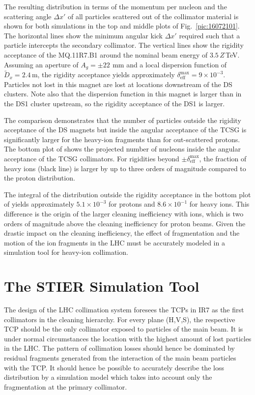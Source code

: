 The resulting distribution in terms of the momentum per nucleon and the scattering angle $\Delta x'$ of all  particles scattered out of the collimator material is shown for both simulations in the top and middle plots of Fig.~\ref{pic:16072101}. The horizontal lines show the minimum angular kick $\Delta x'$ required such that a particle intercepts the secondary collimator. The vertical lines show the rigidity acceptance of the MQ.11R7.B1 around the nominal beam energy of $3.5\,Z\,$TeV. Assuming an aperture of $A_g = \pm 22~\,$mm and a local dispersion function of $\tilde{D}_x = 2.4\,$m, the rigidity acceptance yields approximately \mbox{$\delta_\text{eff}^\text{max}=9 \times 10^{-3}$}. Particles not lost in this magnet are lost at locations downstream of the DS clusters. Note also that the dispersion function in this magnet is larger than in the DS1 cluster upstream, so the rigidity acceptance of the DS1 is larger.

The comparison demonstrates that the number of particles outside the rigidity acceptance of the DS magnets but inside the angular acceptance of the TCSG is significantly larger for the heavy-ion fragments than for out-scattered protons. The bottom plot of  shows the projected number of nucleons inside the angular acceptance of the TCSG collimators. For rigidities beyond $\pm \delta_\text{eff}^\text{max}$, the fraction of heavy ions (black line) is larger by up to three orders of magnitude compared to the proton distribution. 

The integral of the distribution outside the rigidity acceptance in the bottom plot of  yields approximately $5.1 \times 10^{-3}$ for protons and $8.6 \times 10^{-1}$ for heavy ions. This difference is the origin of the larger cleaning inefficiency with \lead ions, which is two orders of magnitude above the cleaning inefficiency for proton beams. Given the drastic impact on the cleaning inefficiency, the effect of fragmentation and the motion of the ion fragments in the LHC must be accurately modeled in a simulation tool for heavy-ion collimation.







\section{The STIER Simulation Tool}

The design of the LHC collimation system foresees the TCPs in IR7 as the first collimators in the cleaning hierarchy. For every plane (H,V,S), the respective TCP should be the only collimator exposed to particles of the main beam. It is under normal circumstances the location with the highest amount of lost particles in the LHC. The pattern of collimation losses should hence be dominated by residual fragments generated from the interaction of the main beam particles with the TCP. It should hence be possible to accurately describe the loss distribution by a simulation model which takes into account only the fragmentation at the primary collimator.

